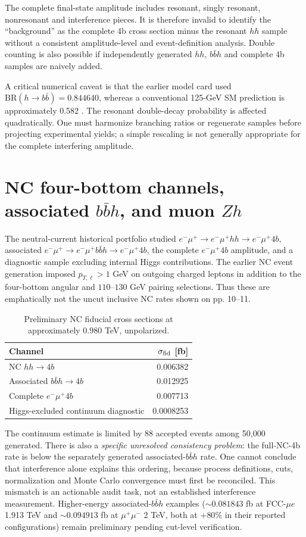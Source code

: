 \documentclass[12pt,a4paper]{article}
\newcommand{\newnote}{\clearpage}
\begin{document}
The complete final-state amplitude includes resonant, singly resonant, nonresonant and interference pieces. It is therefore invalid to identify the ``background'' as the complete 4b cross section minus the resonant $hh$ sample without a consistent amplitude-level and event-definition analysis. Double counting is also possible if independently generated $hh$, $b\bar b h$ and complete 4b samples are naively added.

A critical numerical caveat is that the earlier model card used $\mathrm{BR}(h\to b\bar b)=0.844640$, whereas a conventional 125-GeV SM prediction is approximately 0.582 \cite{pdg}. The resonant double-decay probability is affected quadratically. One must harmonize branching ratios or regenerate samples before projecting experimental yields; a simple rescaling is not generally appropriate for the complete interfering amplitude.





\newnote

\section{NC four-bottom channels, associated $b\bar b h$, and muon $Zh$}
The neutral-current historical portfolio studied $e^-\mu^+\to e^-\mu^+hh\to e^-\mu^+4b$, associated $e^-\mu^+\to e^-\mu^+b\bar b h\to e^-\mu^+4b$, the complete $e^-\mu^+4b$ amplitude, and a diagnostic sample excluding internal Higgs contributions. The earlier NC event generation imposed $p_{T,\ell}>1$ GeV on outgoing charged leptons in addition to the four-bottom angular and $110$--$130$ GeV pairing selections. Thus these are emphatically not the uncut inclusive NC rates shown on pp. 10--11.
\begin{table}[H]\centering\small
\caption{Preliminary NC fiducial cross sections at approximately 0.980 TeV, unpolarized.}
\begin{tabular}{@{}lr@{}}\toprule Channel & $\sigma_{\rm fid}$ [fb]\\\midrule
NC $hh\to4b$ & 0.006382\\
Associated $b\bar b h\to4b$ & 0.012925\\
Complete $e^-\mu^+4b$ & 0.007713\\
Higgs-excluded continuum diagnostic & 0.0008253\\\bottomrule
\end{tabular}\end{table}
The continuum estimate is limited by 88 accepted events among 50,000 generated. There is also a \emph{specific unresolved consistency problem}: the full-NC-4b rate is below the separately generated associated-$b\bar b h$ rate. One cannot conclude that interference alone explains this ordering, because process definitions, cuts, normalization and Monte Carlo convergence must first be reconciled. This mismatch is an actionable audit task, not an established interference measurement. Higher-energy associated-$b\bar b h$ examples ($\sim0.081843$ fb at FCC-$\mu e$ 1.913 TeV and $\sim0.094913$ fb at $\mu^+\mu^-$ 2 TeV, both at $+80\%$ in their reported configurations) remain preliminary pending cut-level verification.
\end{document}
